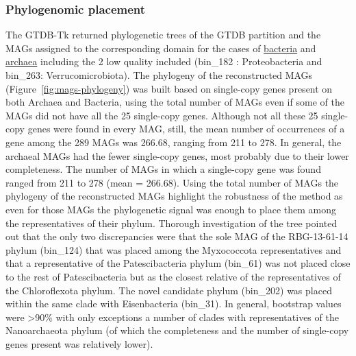 \subsubsection*{Phylogenomic placement}

   The GTDB-Tk returned phylogenetic trees of the GTDB partition and the MAGs assigned to the corresponding domain for the 
   cases of \href{https://github.com/hariszaf/karpathos-swamp/blob/main/GTDB_TK_bins_classification/elos_70_5.bac120.classify.tree}{bacteria} 
   and \href{https://github.com/hariszaf/karpathos-swamp/blob/main/GTDB_TK_bins_classification/elos_70_5.ar122.classify.tree}{archaea} 
   including the 2 low quality included (bin\_182 : Proteobacteria and bin\_263: Verrucomicrobiota). 
   The phylogeny of the reconstructed MAGs (Figure~\ref{fig:mags-phylogeny}) was built based on single-copy genes present on both Archaea and Bacteria, using the total number of MAGs 
   even if some of the MAGs did not have all the 25 single-copy genes. 
   Although not all these 25 single-copy genes were found in every MAG, still, the mean number of occurrences of a gene among the 289 MAGs was 266.68, ranging from 211 to 278. 
   In general, the archaeal MAGs had the fewer single-copy genes, most probably due to their lower completeness. 
   The number of MAGs in which a single-copy gene was found  ranged from 211 to 278 (mean = 266.68). 
   Using the total number of MAGs the phylogeny of the reconstructed MAGs highlight the robustness of the method as even for those MAGs the phylogenetic signal was enough to place 
   them among the representatives of their phylum. 
   Thorough investigation of the tree pointed out that the only two discrepancies were that the sole MAG of the RBG-13-61-14 phylum (bin\_124) that was placed among the 
   Myxococcota representatives and that a representative of the Patescibacteria phylum (bin\_61) was not placed close to the rest of Patescibacteria but as the closest relative of 
   the representatives of the Chloroflexota phylum. 
   The novel candidate phylum (bin\_202) was placed within the same clade with Eisenbacteria (bin\_31). 
   In general, bootstrap values were >90\% with only exceptions a number of clades with representatives of the Nanoarchaeota phylum 
   (of which the completeness and the number of single-copy genes present was relatively lower). 

